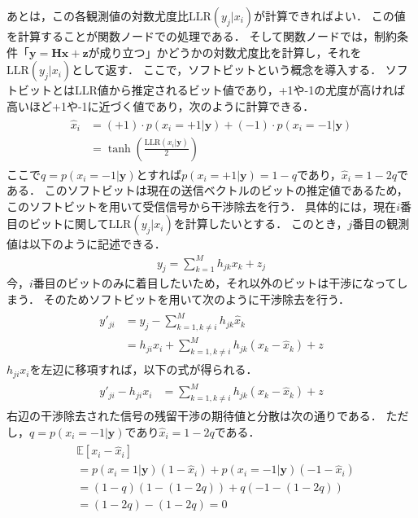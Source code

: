 \documentclass[twocolumn, a4paper]{ieicejsp}
\begin{document}
あとは，この各観測値の対数尤度比$\mathrm{LLR}(y_j | x_i)$が計算できればよい．
この値を計算することが関数ノードでの処理である．
そして関数ノードでは，制約条件「$\mathbf{y} = \mathbf{H} \mathbf{x} + \mathbf{z}$が成り立つ」かどうかの対数尤度比を計算し，それを$\mathrm{LLR}(y_j | x_i)$として返す．
ここで，ソフトビットという概念を導入する．
ソフトビットとはLLR値から推定されるビット値であり，+1や-1の尤度が高ければ高いほど+1や-1に近づく値であり，次のように計算できる．
\begin{align}
  \begin{split}
    \hat{x}_i &= (+1) \cdot p(x_i=+1|\mathbf{y}) + (-1) \cdot p(x_i=-1|\mathbf{y}) \\
    &=\tanh\left(\frac{\mathrm{LLR}(x_i|\mathbf{y})}{2}\right)
  \end{split}
\end{align}
ここで$q=p(x_i=-1|\mathbf{y})$とすれば$p(x_i=+1|\mathbf{y})=1-q$であり，$\hat{x}_i=1-2q$である．
このソフトビットは現在の送信ベクトルのビットの推定値であるため，このソフトビットを用いて受信信号から干渉除去を行う．
具体的には，現在$i$番目のビットに関して$\mathrm{LLR}(y_j | x_i)$を計算したいとする．
このとき，$j$番目の観測値は以下のように記述できる．
\begin{align}
  y_j = \sum_{k=1}^{M} h_{jk} x_k + z_j
\end{align}
今，$i$番目のビットのみに着目したいため，それ以外のビットは干渉になってしまう．
そのためソフトビットを用いて次のように干渉除去を行う．
\begin{align}
  \begin{split}
    y'_{ji} &= y_j - \sum_{k=1, k\not=i}^{M} h_{jk} \hat{x}_k \\
    &= h_{ji} x_i + \sum_{k=1, k\not=i}^{M} h_{jk} (x_k - \hat{x}_k) + z
  \end{split}
\end{align}
$h_{ji}x_i$を左辺に移項すれば，以下の式が得られる．
\begin{align}
  \begin{split}
    y'_{ji} -  h_{ji} x_i &= \sum_{k=1, k\not=i}^{M} h_{jk} (x_k - \hat{x}_k) + z
  \end{split}
\end{align}
右辺の干渉除去された信号の残留干渉の期待値と分散は次の通りである．
ただし，$q=p(x_i=-1|\mathbf{y})$であり$\hat{x}_i=1-2q$である．
\begin{align}
  \begin{split}
    &\mathbb{E}[x_i - \hat{x}_i] \\
    &= p(x_i=1 | \mathbf{y})(1 - \hat{x}_i) + p(x_i=-1 | \mathbf{y})(-1 - \hat{x}_i) \\
    &= (1-q)(1 - (1- 2q)) + q(-1-(1-2q)) \\
    &= (1-2q) - (1-2q) = 0
  \end{split}
\end{align}
\end{document}
